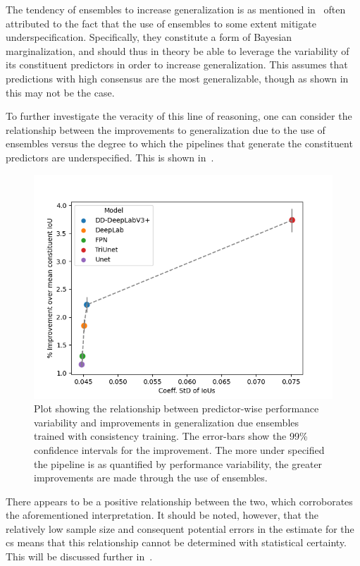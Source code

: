 The tendency of ensembles to increase generalization is as mentioned in~ often attributed to the fact that the use of ensembles to some extent mitigate underspecification. Specifically, they constitute a form of Bayesian marginalization, and should thus in theory be able to leverage the variability of its constituent predictors in order to increase generalization. This assumes that predictions with high consensus are the most generalizable, though as shown in  this may not be the case. 

To further investigate the veracity of this line of reasoning, one can consider the relationship between the improvements to generalization due to the use of ensembles versus the degree to which the pipelines that generate the constituent predictors are underspecified. This is shown in~. 
\begin{figure}[!hbt]
    \centering
    \includegraphics[width=0.9\linewidth]{illustrations/ensembles_underspecification.png}
    \caption[Relationship between ensemble improvements and underspecification]{Plot showing the relationship between predictor-wise performance variability and improvements in generalization due ensembles trained with consistency training. The error-bars show the 99\% confidence intervals for the improvement. The more under specified the pipeline is as quantified by performance variability, the greater improvements are made through the use of ensembles. }
    \label{fig:ensemble_var}
\end{figure}

There appears to be a positive relationship between the two, which corroborates the aforementioned interpretation. It should be noted, however, that the relatively low sample size and consequent potential errors in the estimate for the \gls{cs} means that this relationship cannot be determined with statistical certainty. This will be discussed further in~. 

